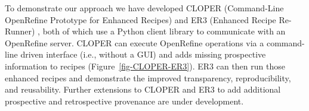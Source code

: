 \documentclass[runningheads]{llncs}
\begin{document}
To demonstrate our approach we have developed CLOPER (Command-Line OpenRefine Prototype for Enhanced
Recipes) and ER3 (Enhanced Recipe Re-Runner) \cite{ORtools2018}, both of which use a Python client
library \cite{makepeace18ORclient} to communicate with an OpenRefine server. CLOPER can execute
OpenRefine operations via a command-line driven interface (i.e., without a GUI) and adds missing
prospective information to recipes (Figure~\ref{fig-CLOPER-ER3}). ER3 can then run those enhanced
recipes and demonstrate the improved transparency, reproducibility, and reusability. Further
extensions to CLOPER and ER3 to add additional prospective and retrospective provenance are under
development.











\end{document}
